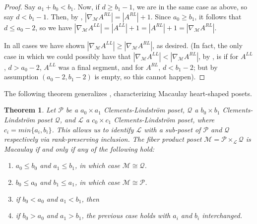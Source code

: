 \documentclass[11pt, reqno]{amsart}
\newcommand{\Q}{{\mathcal Q}}
\renewcommand{\L}{{\mathcal L}}
\newcommand{\M}{{\mathcal M}}
\renewcommand{\P}{{\mathcal P}}
\theoremstyle{plain} %
\newtheorem{thm}{Theorem}[section]
\theoremstyle{definition}
\theoremstyle{remark}
\numberwithin{equation}{section}  %
\begin{document}
\begin{proof}
Say $a_1+b_0 < b_1$. Now, if $d \geq b_1-1$, we are in the same case as above, so say $d < b_1-1$. Then, by , $|\nabla_{\mathcal{M}}A^{RL}| = |A^{RL}| + 1$. Since $a_0 \geq b_1$, it follows that $d \leq a_0-2$, so  we have $|\nabla_{\mathcal{M}}A^{LL}| = |A^{LL}| + 1 = |A^{RL}| + 1 = |\nabla_{\mathcal{M}}A^{RL}|$. 
    
In all cases we have shown $|\nabla_{\mathcal{M}}A^{LL}| \geq |\nabla_{\mathcal{M}}A^{RL}|$, as desired. 
(In fact, the only case in which we could possibly have that $|\nabla_{\mathcal{M}}A^{LL}| < |\nabla_{\mathcal{M}}A^{RL}|$, by , is if for $A^{LL}$, $d > a_0-2$, $A^{LL}$ was a final segment, and for $A^{RL}$, $d < b_1-2$; but by assumption $(a_0-2,b_1-2)$ is empty, so this cannot happen).
\end{proof}


The following theorem generalizes , characterizing Macaulay heart-shaped posets.

 

\begin{thm}\label{thm: heart}
Let  $\P$ be a $a_0\times a_1$  Clements-Lindstr\"om poset, $\Q$ a $b_0\times b_1$ Clements-Lindstr\"om poset $\Q$, and $\L$   a $c_0\times c_1$ Clements-Lindstr\"om poset, where $c_i = min\{a_i,b_i\}$. This allows us to identify $\L$ with a sub-poset of $\P$ and $\Q$ respectively via  rank-preserving inclusion.  The fiber product poset $\M=\P\times_\L \Q$  is Macaulay if and only if any of the following hold:
\begin{enumerate}
    \item $a_0 \leq b_0$ and $a_1\leq b_1$, in which case $\M \cong \Q$.
    \item $b_0 \leq a_0$ and $b_1\leq a_1$, in which case $\M \cong \P$.
    \item if $b_0<a_0$ and $a_1<b_1$, then 
    
    \item if $b_0>a_0$ and $a_1>b_1$,  the previous case holds with $a_i$ and $b_i$ interchanged.
\end{enumerate}
\end{thm}
\end{document}

